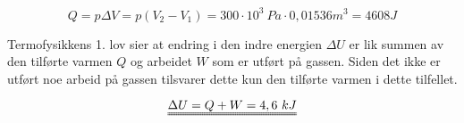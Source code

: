 \documentclass{report}%
\begin{document}
\begin{enumerate}[leftmargin=*,itemsep=1cm,labelsep=2em,label=\alph*)]
$$Q = p \Delta V = p(V_2 - V_1) = 300 \cdot 10^3\ Pa \cdot 0,01536 m^3 = 4608J$$
\begin{center}\end{center}
Termofysikkens 1. lov sier at endring i den indre energien $\Delta U$ er lik summen av den tilførte varmen $Q$ og arbeidet $W$ som er utført på gassen. Siden det ikke er utført noe arbeid på gassen tilsvarer dette kun den tilførte varmen i dette tilfellet.

$$\uuline{\Delta U = Q + W = 4,6\ kJ}$$
\end{enumerate}
\end{document}
